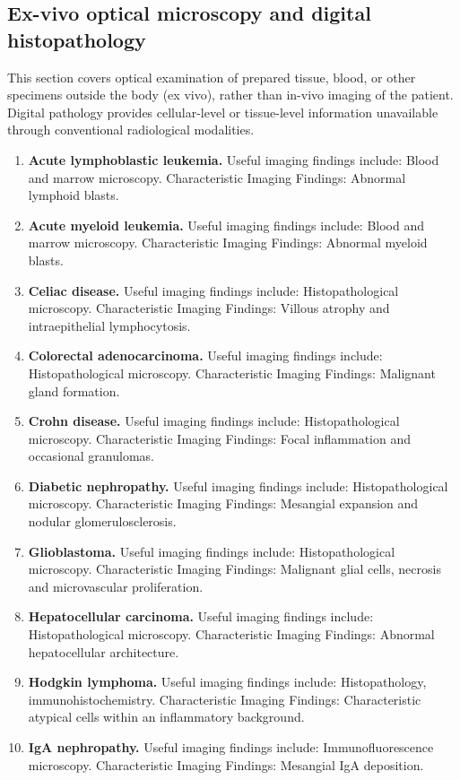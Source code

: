 \subsection{Ex-vivo optical microscopy and digital histopathology}
This section covers optical examination of prepared tissue, blood, or other specimens outside the body (ex vivo), rather than in-vivo imaging of the patient. Digital pathology provides cellular-level or tissue-level information unavailable through conventional radiological modalities.
\begin{enumerate}[leftmargin=*,itemsep=0.45em,topsep=0.4em]
\item \textbf{Acute lymphoblastic leukemia.} Useful imaging findings include: Blood and marrow microscopy. Characteristic Imaging Findings: Abnormal lymphoid blasts.
\item \textbf{Acute myeloid leukemia.} Useful imaging findings include: Blood and marrow microscopy. Characteristic Imaging Findings: Abnormal myeloid blasts.
\item \textbf{Celiac disease.} Useful imaging findings include: Histopathological microscopy. Characteristic Imaging Findings: Villous atrophy and intraepithelial lymphocytosis.
\item \textbf{Colorectal adenocarcinoma.} Useful imaging findings include: Histopathological microscopy. Characteristic Imaging Findings: Malignant gland formation.
\item \textbf{Crohn disease.} Useful imaging findings include: Histopathological microscopy. Characteristic Imaging Findings: Focal inflammation and occasional granulomas.
\item \textbf{Diabetic nephropathy.} Useful imaging findings include: Histopathological microscopy. Characteristic Imaging Findings: Mesangial expansion and nodular glomerulosclerosis.
\item \textbf{Glioblastoma.} Useful imaging findings include: Histopathological microscopy. Characteristic Imaging Findings: Malignant glial cells, necrosis and microvascular proliferation.
\item \textbf{Hepatocellular carcinoma.} Useful imaging findings include: Histopathological microscopy. Characteristic Imaging Findings: Abnormal hepatocellular architecture.
\item \textbf{Hodgkin lymphoma.} Useful imaging findings include: Histopathology, immunohistochemistry. Characteristic Imaging Findings: Characteristic atypical cells within an inflammatory background.
\item \textbf{IgA nephropathy.} Useful imaging findings include: Immunofluorescence microscopy. Characteristic Imaging Findings: Mesangial IgA deposition.

\end{enumerate}
